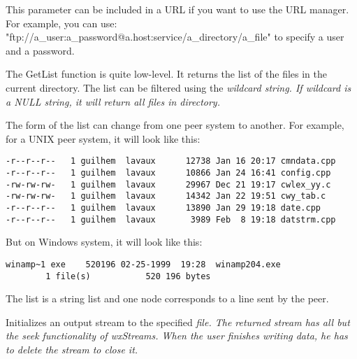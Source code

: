 
This parameter can be included in a URL if you want to use the URL manager.
For example, you can use: "ftp://a\_user:a\_password@a.host:service/a_directory/a\_file"
to specify a user and a password.



The GetList function is quite low-level. It returns the list of the files in
the current directory. The list can be filtered using the \it{wildcard} string.
If \it{wildcard} is a NULL string, it will return all files in directory.

The form of the list can change from one peer system to another. For example,
for a UNIX peer system, it will look like this:

\begin{verbatim}
-r--r--r--   1 guilhem  lavaux      12738 Jan 16 20:17 cmndata.cpp
-r--r--r--   1 guilhem  lavaux      10866 Jan 24 16:41 config.cpp
-rw-rw-rw-   1 guilhem  lavaux      29967 Dec 21 19:17 cwlex_yy.c
-rw-rw-rw-   1 guilhem  lavaux      14342 Jan 22 19:51 cwy_tab.c
-r--r--r--   1 guilhem  lavaux      13890 Jan 29 19:18 date.cpp
-r--r--r--   1 guilhem  lavaux       3989 Feb  8 19:18 datstrm.cpp
\end{verbatim}

But on Windows system, it will look like this:

\begin{verbatim}
winamp~1 exe    520196 02-25-1999  19:28  winamp204.exe
        1 file(s)           520 196 bytes
\end{verbatim}

The list is a string list and one node corresponds to a line sent by the peer.




Initializes an output stream to the specified \it{file}. The returned
stream has all but the seek functionality of wxStreams. When the user finishes
writing data, he has to delete the stream to close it.


